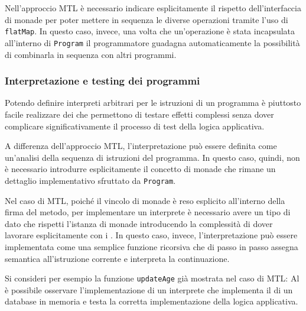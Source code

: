Nell'approccio \ac{MTL} è necessario indicare esplicitamente il rispetto dell'interfaccia di monade per poter mettere in sequenza le diverse operazioni tramite l'uso di \lstinline{flatMap}. In questo caso, invece, una volta che un'operazione è stata incapsulata all'interno di \lstinline{Program} il programmatore guadagna automaticamente la possibilità di combinarla in sequenza con altri programmi.

\subsubsection{Interpretazione e testing dei programmi}
Potendo definire interpreti arbitrari per le istruzioni di un programma è piuttosto facile realizzare dei  che permettono di testare effetti complessi senza dover complicare significativamente il processo di test della logica applicativa.

A differenza dell'approccio \ac{MTL}, l'interpretazione può essere definita come un'analisi della sequenza di istruzioni del programma.
In questo caso, quindi, non è necessario introdurre esplicitamente il concetto di monade che rimane un dettaglio implementativo sfruttato da \lstinline{Program}.

Nel caso di \ac{MTL}, poiché il vincolo di monade è reso esplicito all'interno della firma del metodo, per implementare un interprete è necessario avere un tipo di dato che rispetti l'istanza di monade introducendo la complessità di dover lavorare esplicitamente con i .
In questo caso, invece, l'interpretazione può essere implementata come una semplice funzione ricorsiva che di passo in passo assegna semantica all'istruzione corrente e interpreta la continuazione.

Si consideri per esempio la funzione \lstinline{updateAge} già mostrata nel caso di \ac{MTL}:
Al  è possibile osservare l'implementazione di un interprete che implementa il  di un database in memoria e testa la corretta implementazione della logica applicativa.

